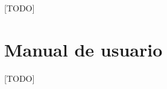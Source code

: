 \documentclass[a4paper, 12pt]{book}
\begin{document}
[TODO]



\cleardoublepage
\appendix
\chapter{Manual de usuario}
\label{app:manual}

[TODO]


\cleardoublepage


\end{document}

